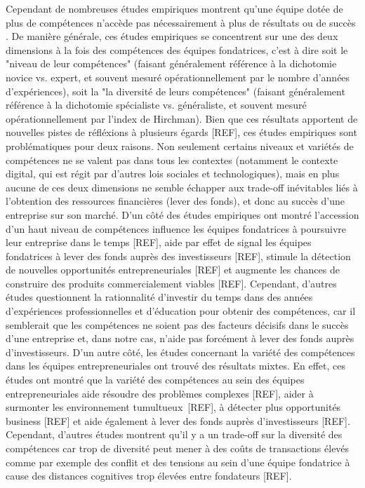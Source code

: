 \documentclass[11pt]{article}
\begin{document}
Cependant de nombreuses études empiriques montrent qu'une équipe dotée de plus de compétences n'accède pas nécessairement à plus de résultats ou de succès \citep{pierce2013too}. De manière générale, ces études empiriques se concentrent sur une des deux dimensions à la fois des compétences des équipes fondatrices, c'est à dire soit le "niveau de leur compétences" (faisant généralement référence à la dichotomie novice vs. expert, et souvent mesuré opérationnellement par le nombre d'années d'expériences), soit la "la diversité de leurs compétences" (faisant généralement référence à la dichotomie spécialiste vs. généraliste, et souvent mesuré opérationnellement par l'index de Hirchman). Bien que ces résultats apportent de nouvelles pistes de réfléxions à plusieurs égards [REF], ces études empiriques sont problématiques pour deux raisons. Non seulement certains niveaux et variétés de compétences ne se valent pas dans tous les contextes (notamment le contexte digital, qui est régit par d'autres lois sociales et technologiques), mais en plus aucune de ces deux dimensions ne semble échapper aux trade-off inévitables liés à l'obtention des ressources financières (lever des fonds), et donc au succès d'une entreprise sur son marché. D'un côté des études empiriques ont montré l'accession d'un haut niveau de compétences influence les équipes fondatrices à poursuivre leur entreprise dans le temps [REF], aide par effet de signal les équipes fondatrices à lever des fonds auprès des investisseurs [REF], stimule la détection de nouvelles opportunités entrepreneuriales [REF] et augmente les chances de construire des produits commercialement viables [REF]. Cependant, d'autres études questionnent la rationnalité d'investir du temps dans des années d'expériences professionnelles et d'éducation pour obtenir des compétences, car il semblerait que les compétences ne soient pas des facteurs décisifs dans le succès d'une entreprise et, dans notre cas, n'aide pas forcément à lever des fonds auprès d'investisseurs. D'un autre côté, les études concernant la variété des compétences dans les équipes entrepreneuriales ont trouvé des résultats mixtes. En effet, ces études ont montré que la variété des compétences au sein des équipes entrepreneuriales aide résoudre des problèmes complexes [REF], aider à surmonter les environnement tumultueux [REF], à détecter plus opportunités business [REF] et aide également à lever des fonds auprès d'investisseurs [REF]. Cependant, d'autres études montrent qu'il y a un trade-off sur la diversité des compétences car trop de diversité peut mener à des coûts de transactions élevés comme par exemple des conflit et des tensions au sein d'une équipe fondatrice à cause des distances cognitives trop élevées entre fondateurs [REF].
\end{document}
